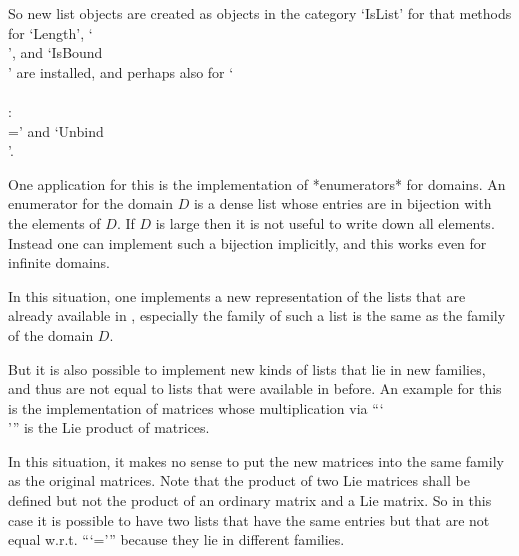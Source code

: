 So new list objects are created as objects in the category `IsList'
for that methods for `Length', `\\[\\]', and `IsBound\\[\\]' are
installed,
and perhaps also for `\\[\\]\\:\\=' and `Unbind\\[\\]'.

One application for this is the implementation of *enumerators*
for domains.
An enumerator for the domain $D$ is a dense list whose entries are
in bijection with the elements of $D$.
If $D$ is large then it is not useful to write down all elements.
Instead one can implement such a bijection implicitly,
and this works even for infinite domains.

In this situation, one implements a new representation of the
lists that are already available in {\GAP},
especially the family of such a list is the same as the family of
the domain $D$.

But it is also possible to implement new kinds of lists that lie in
new families, and thus are not equal to lists that were available
in {\GAP} before.
An example for this is the implementation of matrices
whose multiplication via ```\\\*''' is the Lie product of matrices.

In this situation, it makes no sense to put the new matrices into the
same family as the original matrices.
Note that the product of two Lie matrices shall be defined but not the
product of an ordinary matrix and a Lie matrix.
So in this case it is possible to have two lists that have the same
entries but that are not equal w.r.t. ```=''' because they lie in
different families.



